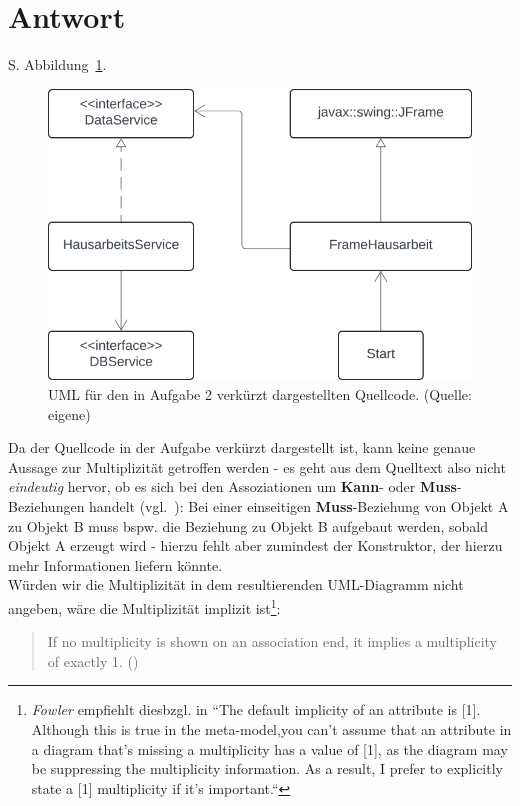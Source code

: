 \section*{Antwort}

S. Abbildung~\ref{fig:aufgabe2}.\\

\begin{figure}
    \centering
    \includegraphics[scale=0.5]{chapters/aufgabe 2/img/aufgabe2}
    \caption{UML für den in Aufgabe 2 verkürzt dargestellten Quellcode. (Quelle: eigene)}
    \label{fig:aufgabe2}
\end{figure}

\noindent
Da der Quellcode in der Aufgabe verkürzt dargestellt ist, kann keine genaue Aussage zur Multiplizität getroffen werden - es geht aus dem Quelltext also nicht \textit{eindeutig} hervor, ob es sich bei den Assoziationen um \textbf{Kann}- oder \textbf{Muss}-Beziehungen handelt (vgl.~\cite[43]{Bal05}): Bei einer einseitigen \textbf{Muss}-Beziehung von Objekt A zu Objekt B muss bspw. die Beziehung zu Objekt B aufgebaut werden, sobald Objekt A erzeugt wird - hierzu fehlt aber zumindest der Konstruktor, der hierzu mehr Informationen liefern könnte. \\

\noindent
Würden wir die Multiplizität in dem resultierenden UML-Diagramm nicht angeben, wäre die Multiplizität implizit \code{[1]} ist\footnote{
    \textit{Fowler} empfiehlt diesbzgl. in \cite[39]{Fow03b} ``The default implicity of an attribute is [1]. Although this is true in the meta-model,you can't assume that an attribute in a diagram that's missing a multiplicity has a value of [1], as the diagram may be suppressing the multiplicity information. As a result, I prefer to explicitly state a [1] multiplicity if it's important.``
    }:
\blockquote[{\cite[19]{OMG17}}]{
If no multiplicity is shown on an association end, it implies a multiplicity of exactly 1. (\cite[19]{OMG17})
}.


